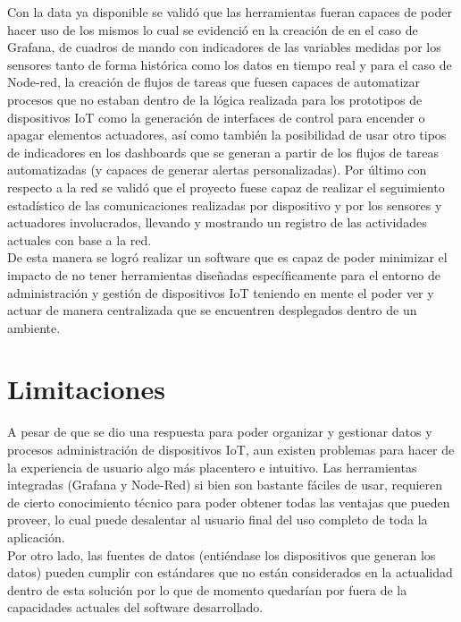 Con la data ya disponible se validó que las herramientas fueran capaces de poder hacer uso de los mismos lo cual se evidenció en la creación de en el caso de Grafana, de cuadros de mando con indicadores de las variables medidas por los sensores tanto de forma histórica como los datos en tiempo real y para el caso de Node-red, la creación de flujos de tareas que fuesen capaces de automatizar procesos que no estaban dentro de la lógica realizada para los prototipos de dispositivos IoT como la generación de interfaces de control para encender o apagar elementos actuadores, así como también la posibilidad de usar otro tipos de indicadores en los dashboards que se generan a partir de los flujos de tareas automatizadas (y capaces de generar alertas personalizadas). Por último con respecto a la red se validó que el proyecto fuese capaz de realizar el seguimiento estadístico de las comunicaciones realizadas por dispositivo y por los sensores y actuadores involucrados, llevando y mostrando un registro de las actividades actuales con base a la red.\\

De esta manera se logró realizar un software que es capaz de poder minimizar el impacto de no tener herramientas diseñadas específicamente para el entorno de administración y gestión de dispositivos IoT teniendo en mente el poder ver y actuar de manera centralizada que se encuentren desplegados dentro de un ambiente.

\section{Limitaciones}
A pesar de que se dio una respuesta para poder organizar y gestionar datos y procesos administración de dispositivos IoT, aun existen problemas para hacer de la experiencia de usuario algo más placentero e intuitivo. Las herramientas integradas (Grafana y Node-Red) si bien son bastante fáciles de usar, requieren de cierto conocimiento técnico para poder obtener todas las ventajas que pueden proveer, lo cual puede desalentar al usuario final del uso completo de toda la aplicación.\\

Por otro lado, las fuentes de datos (entiéndase los dispositivos que generan los datos) pueden cumplir con estándares que no están considerados en la actualidad dentro de esta solución por lo que de momento quedarían por fuera de la capacidades actuales del software desarrollado.

